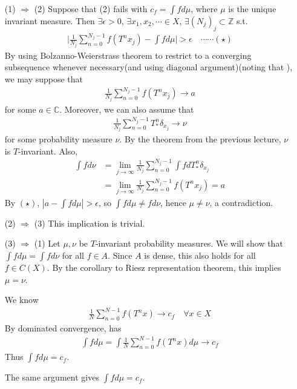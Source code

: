 \documentclass[12pt,a4paper]{report}
\newenvironment{proof}
{\begin{changemargin}{1cm}{0.5cm} 
	}%
	{\end{changemargin}
}
\begin{document}
\begin{proof}
\pf \begin{itemize}
\item[(1) $\Rightarrow$ (2)] Suppose that (2) fails with $c_f = \int fd\mu$, where $\mu$ is the unique invariant measure. Then $\exists \epsilon >0$, $\exists x_1, x_2, \cdots \in X$, $\exists (N_j)_{j} \subset \mathbb{Z}$ s.t. 
\begin{align*}
\Big| \frac{1}{N_j}\sum_{n=0}^{N_j -1} f(T^n x_j) - \int f d\mu \Big| > \epsilon \quad \cdots \cdots (\star)
\end{align*}
By using Bolzanno-Weierstrass theorem to restrict to a converging subsequence whenever necessary(and using diagonal argument)(noting that ), we may suppose that
\begin{align*}
\frac{1}{N_j} \sum_{n=0}^{N_j-1} f(T^n x_j) \rightarrow a
\end{align*}
for some $a\in \mathbb{C}$. Moreover, we can also assume that
\begin{align*}
\frac{1}{N_j} \sum_{n=0}^{N_j-1} T^n_* \delta_{x_j} \rightarrow \nu
\end{align*}
for some probability measure $\nu$. By the theorem from the previous lecture, $\nu$ is $T$-invariant. Also,
\begin{align*}
\int fd\nu &= \lim_{j\rightarrow \infty} \frac{1}{N_j} \sum_{n=0}^{N_j -1} \int f dT^n_* \delta_{x_j} \\
& = \lim_{j\rightarrow \infty} \frac{1}{N_j} \sum_{n=0}^{N_j-1} f(T^n x_j) =a
\end{align*}
By $(\star)$, $|a-\int fd\mu| >\epsilon$, so $\int fd\mu \neq fd\nu$, hence $\mu \neq \nu$, a contradiction.
\item[(2) $\Rightarrow$ (3)] This implication is trivial.
\item[(3) $\Rightarrow$ (1)] Let $\mu, \nu$ be $T$-invariant probability measures. We will show that $\int fd\mu = \int fd \nu$ for all $f\in A$. Since $A$ is dense, this also holds for all $f\in C(X)$. By the corollary to Riesz representation theorem, this implies $\mu = \nu$.

\quad We know
\begin{align*}
\frac{1}{N} \sum_{n=0}^{N-1} f(T^n x) \rightarrow c_f \quad \forall x\in X
\end{align*}
By dominated convergence, has
\begin{align*}
\int f d\mu = \int \frac{1}{N} \sum_{n=0}^{N-1} f(T^n x) d\mu \rightarrow c_f
\end{align*}
Thus $\int fd\mu = c_f$.

The same argument gives $\int fd\mu = c_f$.
\end{itemize}
\eop
\end{proof}
\s
\end{document}
